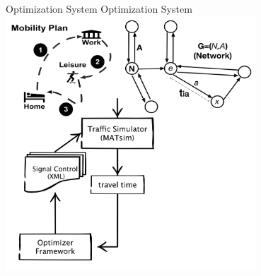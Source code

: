 \createfigure%
{Optimization System}%
{Optimization System}%
{\label{fig:fig2}}%
{\includegraphics[width=0.7\textwidth, angle=0]{./using/figures/qfig2.png}}%
{}



